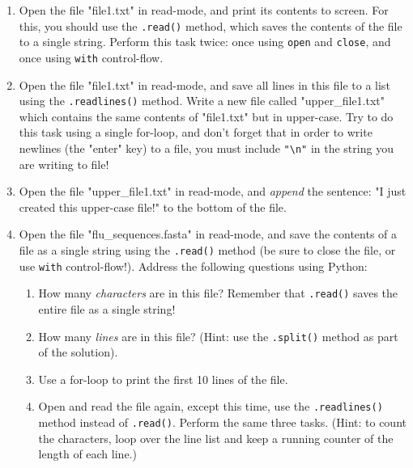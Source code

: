\documentclass{article}[12pt]
\newcommand{\code}[1]{\texttt{#1}}  %
\begin{document}
\begin{enumerate}[itemsep=5ex]
	
	\item Open the file "file1.txt" in read-mode, and print its contents to screen. For this, you should use the \code{.read()} method, which saves the contents of the file to a single string. Perform this task twice: once using \code{open} and \code{close}, and once using \code{with} control-flow.
	
	\item Open the file "file1.txt" in read-mode, and save all lines in this file to a list using the \code{.readlines()} method. Write a new file called "upper\_file1.txt" which contains the same contents of "file1.txt" but in upper-case. Try to do this task using a single for-loop, and don't forget that in order to write newlines (the "enter" key) to a file, you must include \code{"\textbackslash n"} in the string you are writing to file!
	
	\item Open the file "upper\_file1.txt" in read-mode, and \emph{append} the sentence: "I just created this upper-case file!" to the bottom of the file. 
	
	\item Open the file "flu\_sequences.fasta" in read-mode, and save the contents of a file as a single string using the \code{.read()} method (be sure to close the file, or use \code{with} control-flow!). Address the following questions using Python:
	
	\begin{enumerate}[itemsep=2ex]
		\item How many \emph{characters} are in this file? Remember that \code{.read()} saves the entire file as a single string!
		\item How many \emph{lines} are in this file? (Hint: use the \code{.split()} method as part of the solution).
		\item Use a for-loop to print the first 10 lines of the file.
		\item Open and read the file again, except this time, use the \code{.readlines()} method instead of \code{.read()}. Perform the same three tasks. (Hint: to count the characters, loop over the line list and keep a running counter of the length of each line.)
	\end{enumerate}
\end{enumerate}
\end{document}
